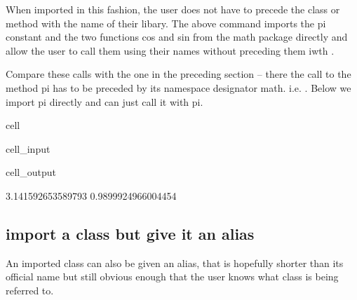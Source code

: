\documentclass[letterpaper,10pt,english]{jupyterBook}
\begin{document}
\sphinxAtStartPar
{}

\sphinxAtStartPar
When imported in this fashion, the user does not have to precede the class or method with the name of their libary. The above  command imports the pi constant and the two functions cos and sin from the math package directly and allow  the user to call them using their names without preceding them iwth .

\sphinxAtStartPar
Compare these calls with the one in the preceding section – there the call to the method pi has to be preceded by its namespace designator math.  i.e. . Below we import pi directly and can just call it with pi.

\begin{sphinxuseclass}{cell}\begin{sphinxVerbatimInput}

\begin{sphinxuseclass}{cell_input}
\begin{sphinxVerbatim}[commandchars=\\\{\}]
   

\end{sphinxVerbatim}

\end{sphinxuseclass}\end{sphinxVerbatimInput}
\begin{sphinxVerbatimOutput}

\begin{sphinxuseclass}{cell_output}
\begin{sphinxVerbatim}[commandchars=\\\{\}]
3.141592653589793
\PYGZhy{}0.9899924966004454
\end{sphinxVerbatim}

\end{sphinxuseclass}\end{sphinxVerbatimOutput}

\end{sphinxuseclass}

\subsection{import a class but give it an alias}
\label{\detokenize{content/04_PythonEssentials/PythonPandasDataframes:import-a-class-but-give-it-an-alias}}
\sphinxAtStartPar
An imported class can also be given an alias, that is hopefully shorter than its official name but still obvious enough that the user knows what class is being referred to.
\end{document}
